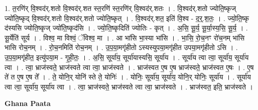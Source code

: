 \documentclass[17pt]{extarticle}
\begin{document}
1. त॒रणि॑र् वि॒श्वद॑र्.शतो वि॒श्वद॑र्.शत स्त॒रणि॑ स्त॒रणि॑र् वि॒श्वद॑र्.शतः । . वि॒श्वद॑र्.शतो ज्योति॒ष्कृज् ज्यो॑ति॒ष्कृद् वि॒श्वद॑र्.शतो वि॒श्वद॑र्.शतो ज्योति॒ष्कृत् । . वि॒श्वद॑र्.शत॒ इति॑ वि॒श्व - द॒र्॒.श॒तः॒ । . ज्यो॒ति॒ष्कृ द॑स्यसि ज्योति॒ष्कृज् ज्यो॑ति॒ष्कृद॑सि । . ज्यो॒ति॒ष्कृदिति॑ ज्योतिः - कृत् । . अ॒सि॒ सू॒र्य॒ सू॒र्या॒स्य॒सि॒ सू॒र्य॒ । . सू॒र्येति॑ सूर्य । . विश्व॒ मा विश्वं॒ ॅविश्व॒ मा । . आ भा॑सि भा॒स्या भा॑सि । . भा॒सि॒ रो॒च॒नꣳ रो॑च॒नम् भा॑सि भासि रोच॒नम् । . रो॒च॒नमिति॑ रोच॒नम् । . उ॒प॒या॒मगृ॑हीतो ऽस्यस्युपया॒मगृ॑हीत उपया॒मगृ॑हीतो ऽसि । . उ॒प॒या॒मगृ॑हीत॒ इत्यु॑पया॒म - गृ॒ही॒तः॒ । . अ॒सि॒ सूर्या॑य॒ सूर्या॑यास्यसि॒ सूर्या॑य । . सूर्या॑य त्वा त्वा॒ सूर्या॑य॒ सूर्या॑य त्वा । . त्वा॒ भ्राज॑स्वते॒ भ्राज॑स्वते त्वा त्वा॒ भ्राज॑स्वते । . भ्राज॑स्वत ए॒ष ए॒ष भ्राज॑स्वते॒ भ्राज॑स्वत ए॒षः । . ए॒ष ते॑ त ए॒ष ए॒ष ते᳚ । . ते॒ योनि॒र् योनि॑ स्ते ते॒ योनिः॑ । . योनिः॒ सूर्या॑य॒ सूर्या॑य॒ योनि॒र् योनिः॒ सूर्या॑य । . सूर्या॑य त्वा त्वा॒ सूर्या॑य॒ सूर्या॑य त्वा । . त्वा॒ भ्राज॑स्वते॒ भ्राज॑स्वते त्वा त्वा॒ भ्राज॑स्वते । . भ्राज॑स्वत॒ इति॒ भ्राज॑स्वते । \newline

\textbf{Ghana Paata } \newline
\end{document}
